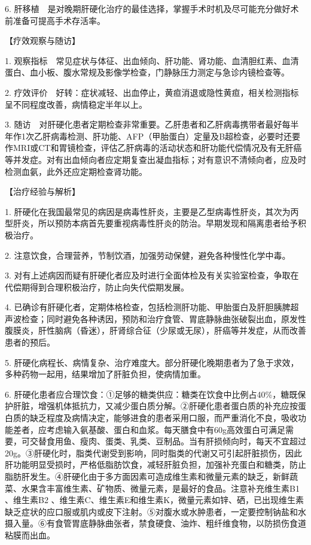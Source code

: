 6.
肝移植　是对晚期肝硬化治疗的最佳选择，掌握手术时机及尽可能充分做好术前准备可提高手术存活率。

【疗效观察与随访】

1.
观察指标　常见症状与体征、出血倾向、肝功能、肾功能、血清胆红素、血清蛋白、血小板、腹水常规及影像学检查，门静脉压力测定与急诊内镜检查等。

2.
疗效评价　好转：症状减轻、出血停止，黄疸消退或隐性黄疸，相关检测指标呈不同程度改善，病情稳定半年以上。

3.
随访　对肝硬化患者定期检查非常重要。乙肝患者和乙肝病毒携带者最好每半年作1次乙肝病毒检测、肝功能、AFP（甲胎蛋白）定量及B超检查，必要时还要作MRI或CT和胃镜检查，评估乙肝病毒的活动状态和肝功能代偿情况及有无肝癌等并发症。对有出血倾向者应定期复查出凝血指标；对有意识不清倾向者，应及时检测血氨，此外还应定期检查肾功能。

【治疗经验与解析】

1.
肝硬化在我国最常见的病因是病毒性肝炎，主要是乙型病毒性肝炎，其次为丙型肝炎，所以预防本病首先要重视病毒性肝炎的防治。早期发现和隔离患者给予积极治疗。

2. 注意饮食，合理营养，节制饮酒，加强劳动保健，避免各种慢性化学中毒。

3.
对有上述病因而疑有肝硬化者应及时进行全面体检及有关实验室检查，争取在代偿期得到合理积极治疗，防止向失代偿期发展。

4.
已确诊有肝硬化者，定期体格检查，包括检测肝功能、甲胎蛋白及肝胆胰脾超声波检查；同时避免各种诱因，预防和治疗食管、胃底静脉曲张破裂出血，原发性腹膜炎，肝性脑病（昏迷），肝肾综合征（少尿或无尿），肝癌等并发症，从而改善患者的预后。

5.
肝硬化病程长、病情复杂、治疗难度大。部分肝硬化晚期患者为了急于求效，多种药物一起用，结果增加了肝脏负担，使病情加重。

6.
肝硬化患者应合理饮食：①足够的糖类供应：糖类在饮食中比例占40\%，糖既保护肝脏，增强机体抵抗力，又减少蛋白质分解。②肝硬化患者蛋白质的补充应按蛋白质的缺乏程度及病情决定，能够进食的患者采用口服，而严重消化不良，吸收功能差者，应考虑输入氨基酸、蛋白和血浆。每天膳食中有60g高效蛋白可满足需要，可交替食用鱼、瘦肉、蛋类、乳类、豆制品。当有肝损倾向时，每天不宜超过20g。③肝硬化时，脂类代谢受到影响，同时脂类的代谢又可引起肝脏损伤，因此肝功能明显受损时，严格低脂肪饮食，减轻肝脏负担，加强补充蛋白和糖类，防止脂肪肝发生。④肝硬化由于多方面因素可造成维生素和微量元素的缺乏，新鲜蔬菜、水果含丰富维生素、矿物质、微量元素，是最好的食品。注意补充维生素B{1}
、维生素B{2}
、维生素C、维生素E和维生素K，微量元素如锌、硒，已出现维生素缺乏症状的应口服或肌内或皮下注射。⑤对腹水或水肿患者，一定要控制钠盐和水摄入量。⑥有食管胃底静脉曲张者，禁食硬食、油炸、粗纤维食物，以防损伤食道粘膜而出血。

